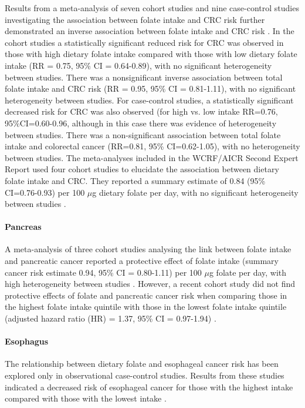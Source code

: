\noindent Results from a meta-analysis of seven cohort studies and nine case-control studies investigating the association between folate intake and CRC risk further demonstrated an inverse association between folate intake and CRC risk \cite{c233}. In the cohort studies a statistically significant reduced risk for CRC was observed in those with high dietary folate intake compared with those with low dietary folate intake (RR = 0.75, 95\% CI = 0.64-0.89), with no significant heterogeneity between studies. There was a nonsignificant inverse association between total folate intake and CRC risk (RR = 0.95, 95\% CI = 0.81-1.11), with no significant heterogeneity between studies. For case-control studies, a statistically significant decreased risk for CRC was also observed (for high vs. low intake RR=0.76, 95\%CI=0.60-0.96, although in this case there was evidence of heterogeneity between studies. There was a non-significant association between total folate intake and colorectal cancer (RR=0.81, 95\% CI=0.62-1.05), with no heterogeneity between studies. The meta-analyses included in the WCRF/AICR Second Expert Report used four cohort studies to elucidate the association between dietary folate intake and CRC. They reported a summary estimate of 0.84 (95\% CI=0.76-0.93) per 100 $\mu$g dietary folate per day, with no significant heterogeneity between studies \cite{c214}. 

\vspace{-0.4cm}
\paragraph{Pancreas} %
A meta-analysis of three cohort studies analysing the link between folate intake and pancreatic cancer reported a protective effect of folate intake (summary cancer risk estimate 0.94, 95\% CI = 0.80-1.11) per 100 $\mu$g folate per day, with high heterogeneity between studies \cite{c214}. However, a recent cohort study did not find protective effects of folate and pancreatic cancer risk when comparing those in the highest folate intake quintile with those in the lowest folate intake quintile (adjusted hazard ratio (HR) = 1.37, 95\% CI = 0.97-1.94) \cite{c234}.

\vspace{-0.4cm}
\paragraph{Esophagus} %
The relationship between dietary folate and esophageal cancer risk has been explored only in observational case-control studies. Results from these studies indicated a decreased risk of esophageal cancer for those with the highest intake compared with those with the lowest intake \cite{c214}.


